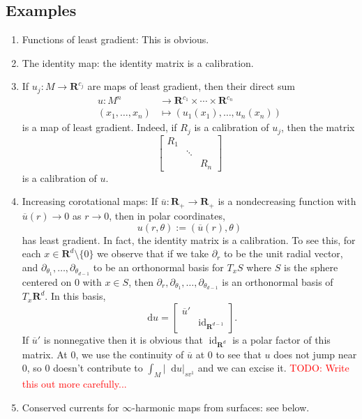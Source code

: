 \documentclass[reqno,11pt]{amsart}
\newcommand{\RR}{\mathbf{R}}
\newcommand*\dif{\mathop{}\!\mathrm{d}}
\DeclareMathOperator{\id}{id}
\theoremstyle{definition}
\numberwithin{equation}{section}
\newcommand\todo[1]{\textcolor{red}{TODO: #1}}
\begin{document}
\subsection{Examples}
\begin{enumerate}
\item Functions of least gradient: This is obvious.
\item The identity map: the identity matrix is a calibration.
\item If $u_j: M \to \RR^{c_j}$ are maps of least gradient, then their direct sum
\begin{align*}
u: M^n &\to \RR^{c_1} \times \cdots \times \RR^{c_n} \\
(x_1, \dots, x_n) &\mapsto (u_1(x_1), \dots, u_n(x_n))
\end{align*}
is a map of least gradient.
Indeed, if $R_j$ is a calibration of $u_j$, then the matrix 
$$\begin{bmatrix}R_1 \\ & \ddots \\ && R_n\end{bmatrix}$$
is a calibration of $u$. 
\item Increasing corotational maps: If $\overline u: \RR_+ \to \RR_+$ is a nondecreasing function with $\overline u(r) \to 0$ as $r \to 0$, then in polar coordinates, 
$$u(r, \theta) := (\overline u(r), \theta)$$
has least gradient.
In fact, the identity matrix is a calibration.
To see this, for each $x \in \RR^d \setminus \{0\}$ we observe that if we take $\partial_r$ to be the unit radial vector, and $\partial_{\theta_1}, \dots, \partial_{\theta_{d - 1}}$ to be an orthonormal basis for $T_x S$ where $S$ is the sphere centered on $0$ with $x \in S$, then $\partial_r, \partial_{\theta_1}, \dots, \partial_{\theta_{d - 1}}$ is an orthonormal basis of $T_x \RR^d$. 
In this basis, 
$$\dif u = \begin{bmatrix}\overline u' \\ & \id_{\RR^{d - 1}}\end{bmatrix}.$$
If $\overline u'$ is nonnegative then it is obvious that $\id_{\RR^d}$ is a polar factor of this matrix. 
At $0$, we use the continuity of $\overline u$ at $0$ to see that $u$ does not jump near $0$, so $0$ doesn't contribute to $\int_M |\dif u|_{sv^1}$ and we can excise it. \todo{Write this out more carefully...}
\item Conserved currents for $\infty$-harmonic maps from surfaces: see below.
\end{enumerate}
\end{document}
